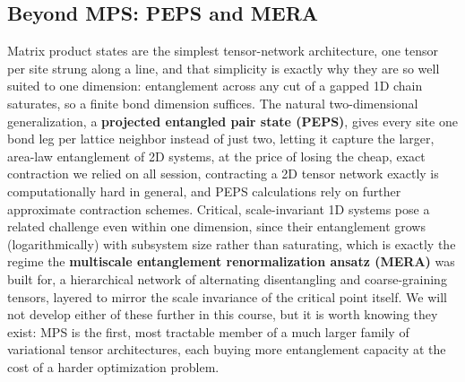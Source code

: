 \documentclass[all_sessions.tex]{subfiles}
\begin{document}
\subsection{Beyond MPS: PEPS and MERA}
Matrix product states are the simplest tensor-network architecture, one tensor per site strung along
a line, and that simplicity is exactly why they are so well suited to one dimension: entanglement
across any cut of a gapped 1D chain saturates, so a finite bond dimension suffices. The natural
two-dimensional generalization, a \textbf{projected entangled pair state (PEPS)}, gives every site
one bond leg per lattice neighbor instead of just two, letting it capture the larger, area-law
entanglement of 2D systems, at the price of losing the cheap, exact contraction we relied on all
session, contracting a 2D tensor network exactly is computationally hard in general, and PEPS
calculations rely on further approximate contraction schemes. Critical, scale-invariant 1D systems
pose a related challenge even within one dimension, since their entanglement grows (logarithmically)
with subsystem size rather than saturating, which is exactly the regime the \textbf{multiscale
entanglement renormalization ansatz (MERA)} was built for, a hierarchical network of alternating
disentangling and coarse-graining tensors, layered to mirror the scale invariance of the critical
point itself. We will not develop either of these further in this course, but it is worth knowing
they exist: MPS is the first, most tractable member of a much larger family of variational tensor
architectures, each buying more entanglement capacity at the cost of a harder optimization problem.
\end{document}
